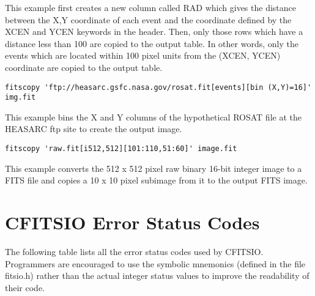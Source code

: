 \documentclass[11pt]{article}
\begin{document}
This example first creates a new column called RAD which gives the
distance between the X,Y coordinate of each event and the coordinate
defined by the XCEN and YCEN keywords in the header.  Then, only those
rows which have a distance less than 100 are copied to the output
table.  In other words, only the events which are located within 100
pixel units from the (XCEN, YCEN) coordinate are copied to the output
table.

\begin{verbatim}
fitscopy 'ftp://heasarc.gsfc.nasa.gov/rosat.fit[events][bin (X,Y)=16]' img.fit
\end{verbatim}

This example bins the X and Y columns of the hypothetical ROSAT file 
at the HEASARC ftp site to create the output image.

\begin{verbatim}
fitscopy 'raw.fit[i512,512][101:110,51:60]' image.fit
\end{verbatim}

This example converts the 512 x 512 pixel raw binary 16-bit integer
image to a FITS file and copies a 10 x 10 pixel subimage from it to the
output FITS image.

\newpage
\section{CFITSIO Error Status Codes}

The following table lists all the error status codes used by CFITSIO.
Programmers are encouraged to use the symbolic mnemonics (defined in
the file fitsio.h) rather than the actual integer status values to
improve the readability of their code.
\end{document}
